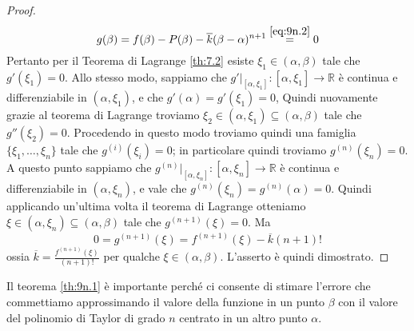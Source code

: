 \begin{proof}
    \[
    g(\beta) = f(\beta)-P(\beta)-\overline{k}(\beta-\alpha)^{n+1}\overset{\eqref{eq:9n.2}}{=}0
    \]
    Pertanto per il Teorema di Lagrange \ref{th:7.2} esiste $\xi_1\in(\alpha,\beta)$ tale che $g'(\xi_1)=0$. Allo stesso modo, sappiamo che $g'|_{[\alpha, \xi_1]}\colon[\alpha,\xi_1]\to\mathbb{R}$ è continua e differenziabile in $(\alpha, \xi_1)$, e che $g'(\alpha)=g'(\xi_1)=0$, Quindi nuovamente grazie al teorema di Lagrange troviamo $\xi_2\in(\alpha, \xi_1)\subseteq (\alpha,\beta)$ tale che $g''(\xi_2)=0$. Procedendo in questo modo troviamo quindi una famiglia $\{\xi_1, \dots, \xi_n\}$ tale che $g^{(i)}(\xi_i)=0$; in particolare quindi troviamo $g^{(n)}(\xi_n)=0$. A questo punto sappiamo che $g^{(n)}|_{[\alpha, \xi_n]}\colon [\alpha, \xi_n]\to \mathbb{R}$ è continua e differenziabile in $(\alpha, \xi_n)$, e vale che $g^{(n)}(\xi_n)= g^{(n)}(\alpha)=0$. Quindi applicando un'ultima volta il teorema di Lagrange otteniamo $\xi\in(\alpha, \xi_n) \subseteq (\alpha, \beta)$ tale che $g^{(n+1)}(\xi)=0$. Ma 
    \[
    0=g^{(n+1)}(\xi) = f^{(n+1)}(\xi)-\overline{k}(n+1)!
    \]
    ossia $\overline{k}=\frac{f^{(n+1)}(\xi)}{(n+1)!}$ per qualche $\xi\in(\alpha,\beta)$. L'asserto è quindi dimostrato.
\end{proof}
Il teorema \ref{th:9n.1} è importante perché ci consente di stimare l'errore che commettiamo approssimando il valore della funzione in un punto $\beta$ con il valore del polinomio di Taylor di grado $n$ centrato in un altro punto $\alpha$.
